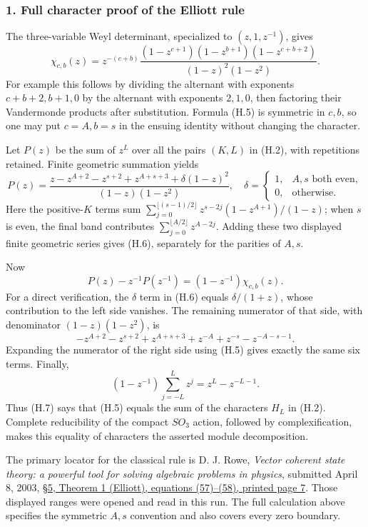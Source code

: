 \documentclass[
  10pt,
]{article}
\begin{document}
\subsubsection{1. Full character proof of the Elliott
rule}\label{full-character-proof-of-the-elliott-rule}

The three-variable Weyl determinant, specialized to \((z,1,z^{-1})\),
gives \[
\chi_{c,b}(z)
=z^{-(c+b)}
\frac{(1-z^{c+1})(1-z^{b+1})(1-z^{c+b+2})}
{(1-z)^2(1-z^2)}.
\tag{H.5}
\] For example this follows by dividing the alternant with exponents
\(c+b+2,b+1,0\) by the alternant with exponents \(2,1,0\), then
factoring their Vandermonde products after substitution. Formula (H.5)
is symmetric in \(c,b\), so one may put \(c=A,b=s\) in the ensuing
identity without changing the character.

Let \(P(z)\) be the sum of \(z^L\) over all the pairs \((K,L)\) in
(H.2), with repetitions retained. Finite geometric summation yields \[
P(z)=
\frac{z-z^{A+2}-z^{s+2}+z^{A+s+3}
+\delta(1-z)^2}{(1-z)(1-z^2)},
\quad
\delta=
\begin{cases}1,&A,s\text{ both even},\\0,&\text{otherwise}.\end{cases}
\tag{H.6}
\] Here the positive-\(K\) terms sum
\(\sum_{j=0}^{\lfloor(s-1)/2\rfloor}
z^{s-2j}(1-z^{A+1})/(1-z)\); when \(s\) is even, the final band
contributes \(\sum_{j=0}^{\lfloor A/2\rfloor}z^{A-2j}\). Adding these
two displayed finite geometric series gives (H.6), separately for the
parities of \(A,s\).

Now \[
P(z)-z^{-1}P(z^{-1})
=(1-z^{-1})\chi_{c,b}(z).
\tag{H.7}
\] For a direct verification, the \(\delta\) term in (H.6) equals
\(\delta/(1+z)\), whose contribution to the left side vanishes. The
remaining numerator of that side, with denominator \((1-z)(1-z^2)\), is
\[
-z^{A+2}-z^{s+2}+z^{A+s+3}
+z^{-A}+z^{-s}-z^{-A-s-1}.
\] Expanding the numerator of the right side using (H.5) gives exactly
the same six terms. Finally, \[
(1-z^{-1})\sum_{j=-L}^{L}z^j=z^L-z^{-L-1}.
\] Thus (H.7) says that (H.5) equals the sum of the characters \(H_L\)
in (H.2). Complete reducibility of the compact \(SO_3\) action, followed
by complexification, makes this equality of characters the asserted
module decomposition.

The primary locator for the classical rule is D. J. Rowe, \emph{Vector
coherent state theory: a powerful tool for solving algebraic problems in
physics}, submitted April 8, 2003,
\href{https://www.physics.utoronto.ca/site-archive/rowe/pdf/Erice.pdf}{§5,
Theorem 1 (Elliott), equations (57)--(58), printed page 7}. Those
displayed ranges were opened and read in this run. The full calculation
above specifies the symmetric \(A,s\) convention and also covers every
zero boundary.
\end{document}
